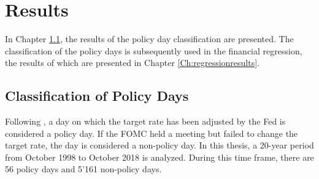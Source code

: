 \documentclass[11pt,a4paper,english,oneside]{book}
\numberwithin{equation}{chapter}
\begin{document}
%
%
%
%
%


\chapter{Results}\label{Ch:results}

In Chapter \ref{Ch:classification}, the results of the policy day classification are presented. The classification of the policy days is subsequently used in the financial regression, the results of which are presented in Chapter \ref{Ch:regressionresults}.

\section{Classification of Policy Days}\label{Ch:classification}

Following \cite{Ellingsen.2003}, a day on which the target rate has been adjusted by the Fed is considered a policy day. If the FOMC held a meeting but failed to change the target rate, the day is considered a non-policy day. In this thesis, a 20-year period from October 1998 to October 2018 is analyzed. During this time frame, there are 56 policy days and 5'161 non-policy days. 
\end{document}
